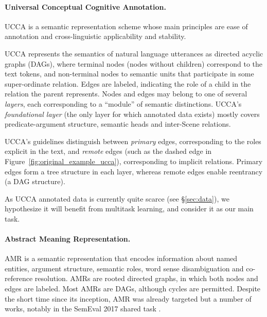 \documentclass[11pt,a4paper]{article}
\begin{document}
\paragraph{Universal Conceptual Cognitive Annotation.}\label{sec:ucca}
UCCA \cite{abend2013universal} is a semantic representation scheme whose main principles
are ease of annotation and cross-linguistic applicability and stability.

UCCA represents the semantics of natural language utterances
as directed acyclic graphs (DAGs), where terminal nodes (nodes without children)
correspond to the text tokens, and non-terminal nodes to semantic units that participate
in some super-ordinate relation.
Edges are labeled, indicating the role of a child in the relation the parent represents.
Nodes and edges may belong to one of several \textit{layers}, each corresponding
to a ``module'' of semantic distinctions.
UCCA's \textit{foundational layer} (the only layer for which annotated data exists) 
mostly covers predicate-argument structure, semantic heads and inter-Scene relations.

UCCA's guidelines distinguish between \textit{primary} edges, corresponding 
to the roles explicit in the text, and \textit{remote} edges (such as the dashed edge in
Figure~\ref{fig:original_example_ucca}), corresponding to implicit relations.
Primary edges form a tree structure in each layer,
whereas remote edges enable reentrancy (a DAG structure).

As UCCA annotated data is currently quite scarce (see \S\ref{sec:data}), 
we hypothesize it will benefit from multitask learning, and consider it as our
main task.

\paragraph{Abstract Meaning Representation.}\label{sec:amr}

AMR \cite{banarescu2013abstract}
is a semantic representation that encodes information about named entities, 
argument structure, semantic roles, word sense disambiguation and co-reference resolution.
AMRs are rooted directed graphs, in which both nodes and edges are labeled.
Most AMRs are DAGs, although cycles are permitted.
Despite the short time since its inception, AMR was already targeted but a number of works,
notably in the SemEval 2017 shared task \cite{may2017semeval}.
\end{document}
